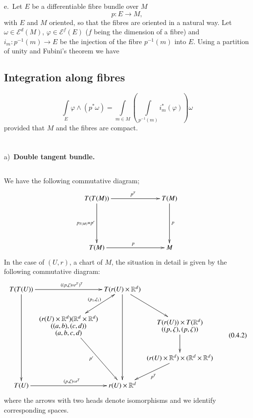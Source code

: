 e.~Let $E$ be a differentiable fibre bundle over $M$
$$
p:E\to M,
$$
with $E$ and $M$ oriented, so that the fibres are oriented in a
natural way. Let $\omega\in \mathscr{E}^{d}(M)$,
$\varphi\in\mathscr{E}^{f}(E)$ ($f$ being the dimension of a fibre)
and $i_{m}:p^{-1}(m)\to E$ be the injection of the fibre $p^{-1}(m)$
into $E$. Using a partition of unity and Fubini's theorem we have

\setcounter{subsection}{16}
\subsection{Integration along fibres}\label{chap0:0.3.17}

$$
\int\limits_{E}\varphi\wedge (p^{\ast}\omega)=\int\limits_{m\in
M}(\int\limits_{p^{-1}(m)}i^{\ast}_{m}(\varphi))\omega 
$$
provided \pageoriginale that $M$ and the fibres are compact.

\section{}\label{chap0:sec4}

a)~{\bf Double tangent bundle.}

\subsection{}\label{chap0:0.4.1}

We have the following commutative diagram;
\[
\xymatrix@R=2cm@C=2.5cm{
T(T(M))\ar[r]^{p^{T}}\ar[d]_{p_{T(M)}=p'} & T(M)\ar[d]^{p}\\
T(M)\ar[r]^{p} & M
}
\]
In the case of $(U,r)$, a chart of $M$, the situation in detail is
given by the following commutative diagram:
{\fontsize{9}{11}\selectfont
\begin{equation*}
\vcenter{
\xymatrix@C=.1cm{
T(T(U))\ar[ddd]\ar[rr]^{((p,\zeta)\circ r^{T})^{T}} & & T(r(U)\times
\mathbb{R}^{d})\ar[ddd]\ar[dr] & \\
 & \txt{$(r(U)\times
  \mathbb{R}^{d})(\mathbb{R}^{d}\times\mathbb{R}^{d})$\\$((a,b),(c,d))$\\$(a,b,c,d)$}\ar@{<->}[ur]^-{(p_{1},\zeta_{1})}\ar[ddr]_{p'}
& & \txt{$T(r(U))\times
  T(\mathbb{R}^{d})$\\$((p,\zeta),(p,\zeta))$}\ar[d]\\
 & & & (r(U)\times \mathbb{R}^{d})\times(\mathbb{R}^{d}\times
\mathbb{R}^{d})\ar[dl]^{p^{T}}\\
T(U)\ar[rr]^{(p,\zeta)\circ r^{T}} & & r(U)\times\mathbb{R}^{d} & 
}
}\tag{0.4.2}\label{chap0:0.4.2}
\end{equation*}}\relax
where \pageoriginale the arrows with two heads denote isomorphisms and
we identify 
corresponding spaces.

